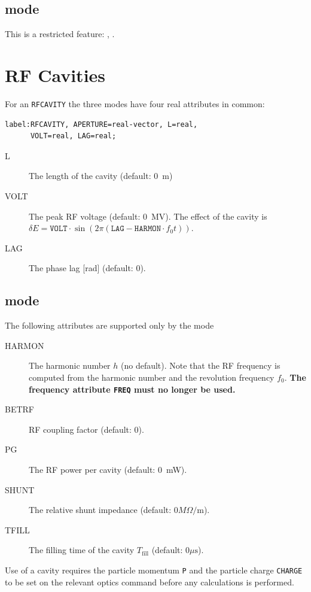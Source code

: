 \subsection{\opalcycl mode}

This is a restricted feature: \noopalt, \noopalcycl .

\section{RF Cavities}
\label{sec:cavity}
For an \texttt{RFCAVITY} the three modes have four real attributes in common:
\begin{verbatim}
label:RFCAVITY, APERTURE=real-vector, L=real, 
      VOLT=real, LAG=real;
\end{verbatim}
\begin{description}
\item[L]
  The length of the cavity (default: 0~m)
\item[VOLT]
  The peak RF voltage (default: 0~MV).
  The effect of the cavity is
  $\delta E=\mathtt{VOLT}\cdot\sin(2\pi(\mathtt{LAG}-\mathtt{HARMON}\cdot f_0 t))$.
\item[LAG]
  The phase lag [rad] (default: 0).
\end{description}

\subsection{\opalmap mode}
The following attributes are supported only by the \opalmap mode
\begin{description}
\item[HARMON]
  The harmonic number $h$ (no default).
  Note that the RF frequency is computed from the harmonic number
  and the revolution frequency $f_0$.
  \textbf{The frequency attribute \texttt{FREQ} must no longer be used.}
\item[BETRF]
  RF coupling factor (default: 0).
\item[PG]
  The RF power per cavity (default: 0~mW).
\item[SHUNT]
  The relative shunt impedance (default: $0 M\Omega/\mathrm{m}$).
\item[TFILL]
  The filling time of the cavity $T_\mathrm{fill}$
  (default: $0 \mu\mathrm{s}$).
\end{description}
Use of a cavity requires the particle momentum \texttt{P}
and the particle charge \texttt{CHARGE} to be set on the relevant 
optics command before any calculations is performed.

